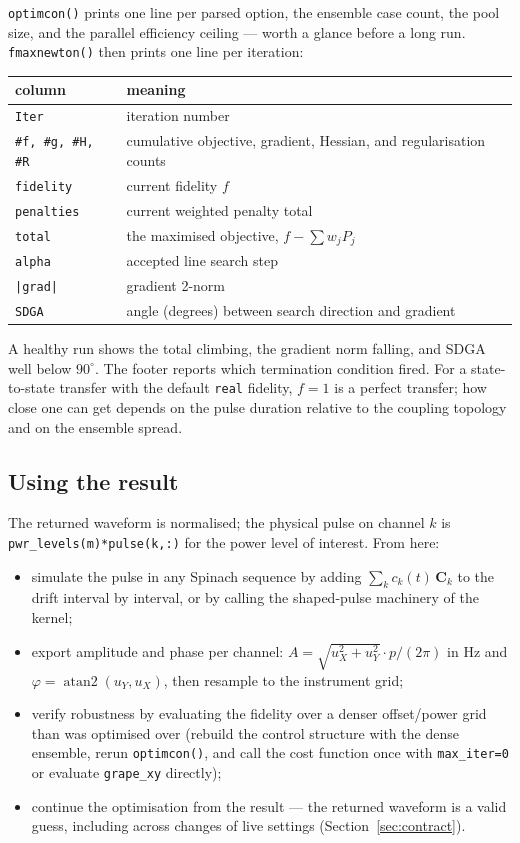 \documentclass[11pt,a4paper]{article}
\newcommand{\code}[1]{\texttt{#1}}
\begin{document}
\code{optimcon()} prints one line per parsed option, the ensemble case
count, the pool size, and the parallel efficiency ceiling ---
worth a glance before a long run. \code{fmaxnewton()} then prints one
line per iteration:
\begin{center}
\begin{tabular}{ll}
\toprule
column & meaning \\
\midrule
\code{Iter} & iteration number\\
\code{\#f, \#g, \#H, \#R} & cumulative objective, gradient, Hessian,
                            and regularisation counts\\
\code{fidelity} & current fidelity $f$ \\
\code{penalties} & current weighted penalty total\\
\code{total} & the maximised objective, $f-\sum w_jP_j$\\
\code{alpha} & accepted line search step\\
\code{|grad|} & gradient 2-norm\\
\code{SDGA} & angle (degrees) between search direction and gradient\\
\bottomrule
\end{tabular}
\end{center}
A healthy run shows the total climbing, the gradient norm falling, and
SDGA well below $90^\circ$. The footer reports which termination
condition fired. For a state-to-state transfer with the default
\code{real} fidelity, $f=1$ is a perfect transfer; how close one can get
depends on the pulse duration relative to the coupling topology and on
the ensemble spread.

\subsection{Using the result}

The returned waveform is normalised; the physical pulse on channel $k$
is \code{pwr\_levels(m)*pulse(k,:)} for the power level of interest.
From here:
\begin{itemize}
\item simulate the pulse in any Spinach sequence by adding
  $\sum_k c_k(t)\,\mathbf{C}_k$ to the drift interval by interval, or by
  calling the shaped-pulse machinery of the kernel;
\item export amplitude and phase per channel:
  $A=\sqrt{u_X^2+u_Y^2}\cdot p/(2\pi)$ in Hz and
  $\varphi=\operatorname{atan2}(u_Y,u_X)$, then resample to the
  instrument grid;
\item verify robustness by evaluating the fidelity over a denser
  offset/power grid than was optimised over (rebuild the control
  structure with the dense ensemble, rerun \code{optimcon()}, and call
  the cost function once with \code{max\_iter=0} or evaluate
  \code{grape\_xy} directly);
\item continue the optimisation from the result --- the returned
  waveform is a valid guess, including across changes of live settings
  (Section~\ref{sec:contract}).
\end{itemize}
\end{document}
